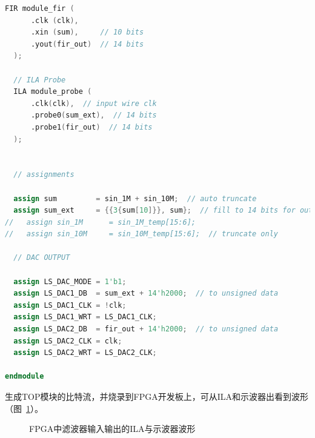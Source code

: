 \begin{lstlisting}[language=verilog,caption={顶层模块}]
  FIR module_fir (
      .clk (clk),
      .xin (sum),     // 10 bits
      .yout(fir_out)  // 14 bits
  );

  // ILA Probe
  ILA module_probe (
      .clk(clk),  // input wire clk
      .probe0(sum_ext),  // 14 bits 
      .probe1(fir_out)  // 14 bits
  );


  // assignments

  assign sum         = sin_1M + sin_10M;  // auto truncate
  assign sum_ext     = {{3{sum[10]}}, sum};  // fill to 14 bits for output
//   assign sin_1M      = sin_1M_temp[15:6];
//   assign sin_10M     = sin_10M_temp[15:6];  // truncate only

  // DAC OUTPUT

  assign LS_DAC_MODE = 1'b1;
  assign LS_DAC1_DB  = sum_ext + 14'h2000;  // to unsigned data
  assign LS_DAC1_CLK = !clk;
  assign LS_DAC1_WRT = LS_DAC1_CLK;
  assign LS_DAC2_DB  = fir_out + 14'h2000;  // to unsigned data
  assign LS_DAC2_CLK = clk;
  assign LS_DAC2_WRT = LS_DAC2_CLK;

endmodule

\end{lstlisting}

生成TOP模块的比特流，并烧录到FPGA开发板上，可从ILA和示波器出看到波形（图~\ref{fig:exp4:Implementation}）。
\begin{figure}[htbp]
  \centering
  \newline
  \caption{FPGA中滤波器输入输出的ILA与示波器波形}
  \label{fig:exp4:Implementation}
\end{figure}

